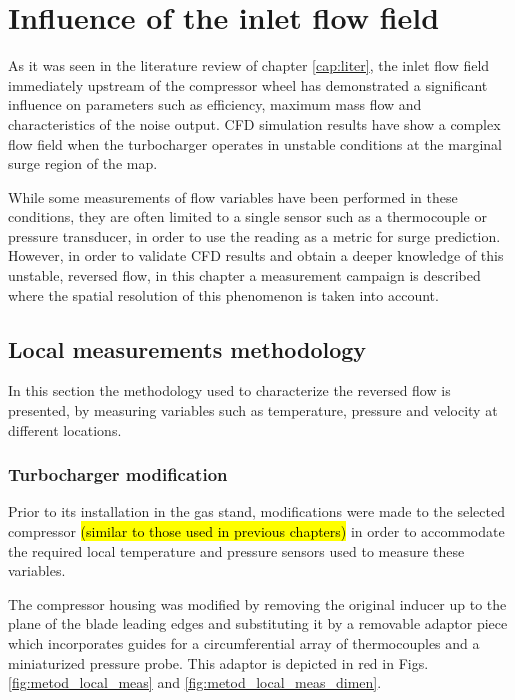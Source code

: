 \chapter{Influence of the inlet flow field}
\label{cap:inlet}

\noindent As it was seen in the literature review of chapter \ref{cap:liter}, the inlet flow field immediately upstream of the compressor wheel has demonstrated a significant influence on parameters such as efficiency, maximum mass flow and characteristics of the noise output. CFD simulation results have show a complex flow field when the turbocharger operates in unstable conditions at the marginal surge region of the map.

While some measurements of flow variables have been performed in these conditions, they are often limited to a single sensor such as a thermocouple or pressure transducer, in order to use the reading as a metric for surge prediction. However, in order to validate CFD results and obtain a deeper knowledge of this unstable, reversed flow, in this chapter a measurement campaign is described where the spatial resolution of this phenomenon is taken into account.

\section{Local measurements methodology}

In this section the methodology used to characterize the reversed flow is presented, by measuring variables such as temperature, pressure and velocity at different locations.

\subsection{Turbocharger modification}
\label{sub:inlet_setup}

Prior to its installation in the gas stand, modifications were made to the selected compressor \hl{(similar to those used in previous chapters)} in order to accommodate the required local temperature and pressure sensors used to measure these variables.

The compressor housing was modified by removing the original inducer up to the plane of the blade leading edges and substituting it by a removable adaptor piece which incorporates guides for a circumferential array of thermocouples and a miniaturized pressure probe. This adaptor is depicted in red in Figs. \ref{fig:metod_local_meas} and \ref{fig:metod_local_meas_dimen}.

